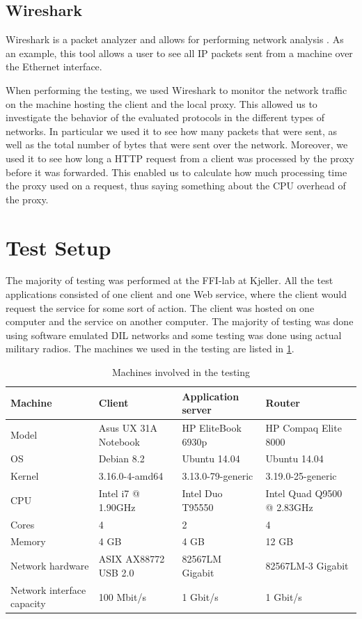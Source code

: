 \subsection{Wireshark}

Wireshark is a packet analyzer and allows for performing network
analysis \cite{wireshark-homepage}. As an example, this tool allows a user to
see all IP packets sent from a machine over the Ethernet interface.

When performing the testing, we used Wireshark to monitor the network traffic on
the machine hosting the client and the local proxy. This allowed us to
investigate the behavior of the evaluated protocols in the different types of
networks. In particular we used it to see how many packets that were sent, as
well as the total number of bytes that were sent over the network. Moreover, we used
it to see how long a HTTP request from a client was processed by the proxy
before it was forwarded. This enabled us to calculate how much processing time the
proxy used on a request, thus saying something about the CPU overhead of the proxy.

\section{Test Setup}
\label{testing-environment}

The majority of testing was performed at the FFI-lab at Kjeller. All the test
applications consisted of one client and one Web service, where the client would
request the service for some sort of action. The client was hosted on one
computer and the service on another computer. The majority of testing was done
using software emulated DIL networks and some testing was done using actual
military radios. The machines we used in the testing are listed in
\cref{table-machines}.

\begin{table}[h]
\begin{tabularx}{\textwidth}{| l | X | X | X |}
\hline
  \textbf{Machine} & \textbf{Client} & \textbf{Application server} & \textbf{Router}\\ \hline
  Model & Asus UX 31A Notebook & HP EliteBook 6930p & HP Compaq Elite 8000 \\ \hline
  OS & Debian 8.2 & Ubuntu 14.04 & Ubuntu 14.04\\ \hline
  Kernel & 3.16.0-4-amd64 & 3.13.0-79-generic & 3.19.0-25-generic\\ \hline
  CPU & Intel i7 @ 1.90GHz & Intel Duo T95550 & Intel Quad Q9500 @ 2.83GHz \\ \hline
  Cores & 4 & 2 & 4\\ \hline
  Memory & 4 GB & 4 GB & 12 GB\\ \hline
  Network hardware & ASIX AX88772 USB 2.0 & 82567LM Gigabit & 82567LM-3 Gigabit\\ \hline
  Network interface capacity & 100 Mbit/s & 1 Gbit/s & 1 Gbit/s \\ \hline
\end{tabularx}
\caption{Machines involved in the testing}
\label{table-machines}
\end{table}

